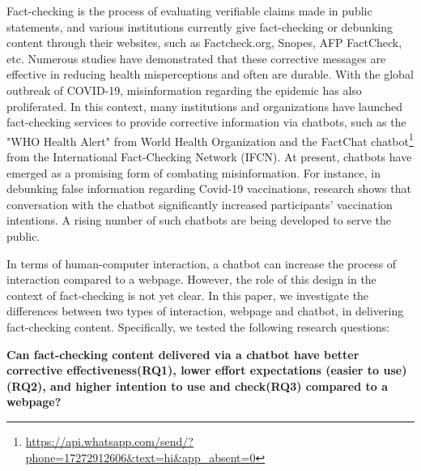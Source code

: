 Fact-checking is the process of evaluating verifiable claims made in public statements\cite[]{brandtzaeg2017trust}, and various institutions currently give fact-checking or debunking content through their websites\cite[]{pal2019communicating}, such as Factcheck.org, Snopes, AFP FactCheck, etc.
Numerous studies have demonstrated that these corrective messages are effective in reducing health misperceptions\cite[]{walter2018unring,bode2018see,lee2020effects} and often are durable\cite[]{porter2021global}.
With the global outbreak of COVID-19, misinformation regarding the epidemic has also proliferated. 
In this context, many institutions and organizations have launched fact-checking services to provide corrective information via chatbots, such as the "WHO Health Alert"\cite[]{walwema2021health} from World Health Organization and the FactChat chatbot\footnote{\url{https://api.whatsapp.com/send/?phone=17272912606&text=hi&app_absent=0}} from the International Fact-Checking Network (IFCN). 
At present, chatbots have emerged as a promising form of combating misinformation.
For instance, in debunking false information regarding Covid-19 vaccinations, research shows that conversation with the chatbot significantly increased participants' vaccination intentions\cite[]{altay2021information}.
A rising number of such chatbots\cite[]{rodsawang2020designing,roque2021botcovid,siedlikowski2021chloe, almalki2020health} are being developed to serve the public.

In terms of human-computer interaction, a chatbot can increase the process of interaction compared to a webpage. 
However, the role of this design in the context of fact-checking is not yet clear. 
In this paper, we investigate the differences between two types of interaction, webpage and chatbot, in delivering fact-checking content. 
Specifically, we tested the following research questions:

\textbf{Can fact-checking content delivered via a chatbot have better corrective effectiveness(RQ1), lower effort expectations (easier to use) (RQ2), and higher intention to use and check(RQ3) compared to a webpage?}

